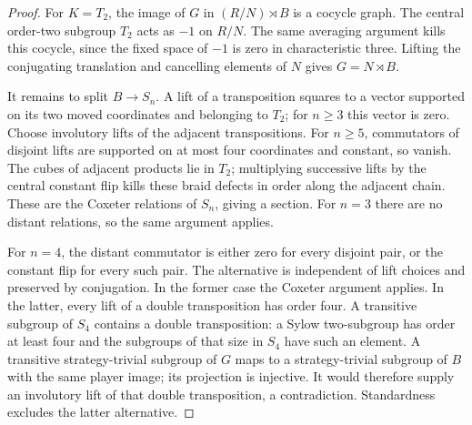 \begin{proof}
For $K=T_2$, the image of $G$ in $(R/N)\rtimes B$ is a cocycle graph.
The central order-two subgroup $T_2$ acts as $-1$ on $R/N$. The same
averaging argument kills this cocycle, since the fixed space of $-1$ is
zero in characteristic three. Lifting the conjugating translation and
cancelling elements of $N$ gives $G=N\rtimes B$.

It remains to split $B\to S_n$. A lift of a transposition squares to a
vector supported on its two moved coordinates and belonging to $T_2$;
for $n\geq3$ this vector is zero. Choose involutory lifts of the adjacent
transpositions. For $n\geq5$, commutators of disjoint lifts are supported
on at most four coordinates and constant, so vanish. The cubes of adjacent
products lie in $T_2$; multiplying successive lifts by the central constant
flip kills these braid defects in order along the adjacent chain. These
are the Coxeter relations of $S_n$, giving a section. For $n=3$ there
are no distant relations, so the same argument applies.

For $n=4$, the distant commutator is either zero for every disjoint pair,
or the constant flip for every such pair. The alternative is independent
of lift choices and preserved by conjugation. In the former case the
Coxeter argument applies. In the latter, every lift of a double
transposition has order four. A transitive subgroup of $S_4$ contains a
double transposition: a Sylow two-subgroup has order at least four and
the subgroups of that size in $S_4$ have such an element. A transitive
strategy-trivial subgroup of $G$ maps to a strategy-trivial subgroup of
$B$ with the same player image; its projection is injective. It would
therefore supply an involutory lift of that double transposition, a
contradiction. Standardness excludes the latter alternative.
\end{proof}

